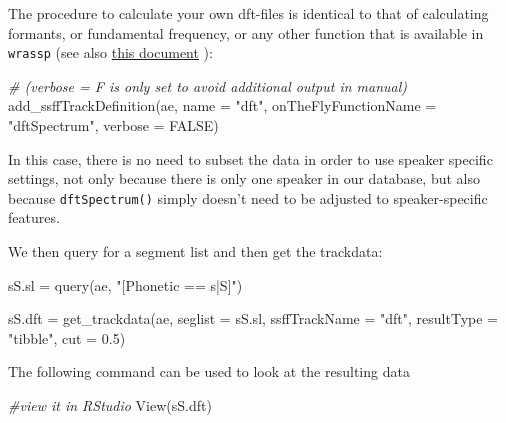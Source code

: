 \documentclass[
]{book}
\newenvironment{Shaded}{\begin{snugshade}}{\end{snugshade}}
\newcommand{\AttributeTok}[1]{\textcolor[rgb]{0.77,0.63,0.00}{#1}}
\newcommand{\CommentTok}[1]{\textcolor[rgb]{0.56,0.35,0.01}{\textit{#1}}}
\newcommand{\ConstantTok}[1]{\textcolor[rgb]{0.00,0.00,0.00}{#1}}
\newcommand{\FloatTok}[1]{\textcolor[rgb]{0.00,0.00,0.81}{#1}}
\newcommand{\FunctionTok}[1]{\textcolor[rgb]{0.00,0.00,0.00}{#1}}
\newcommand{\NormalTok}[1]{#1}
\newcommand{\OtherTok}[1]{\textcolor[rgb]{0.56,0.35,0.01}{#1}}
\newcommand{\StringTok}[1]{\textcolor[rgb]{0.31,0.60,0.02}{#1}}
\begin{document}
The procedure to calculate your own dft-files is identical to that of calculating formants, or fundamental frequency, or any other function that is available in \texttt{wrassp} (see also \href{http://www.phonetik.uni-muenchen.de/\%7Ejmh/lehre/sem/ws1819/emuR/LESSON4/Signal_Data_Calculation_Extraction_Plotting.html}{this document} ):

\begin{Shaded}
\begin{Highlighting}[]
\CommentTok{\# (verbose = F is only set to avoid additional output in manual)}
\FunctionTok{add\_ssffTrackDefinition}\NormalTok{(ae,}
                        \AttributeTok{name =} \StringTok{"dft"}\NormalTok{,}
                        \AttributeTok{onTheFlyFunctionName =} \StringTok{"dftSpectrum"}\NormalTok{,}
                        \AttributeTok{verbose =} \ConstantTok{FALSE}\NormalTok{)}
\end{Highlighting}
\end{Shaded}

In this case, there is no need to subset the data in order to use speaker specific settings, not only because there is only one speaker in our database, but also because \texttt{dftSpectrum()} simply doesn't need to be adjusted to speaker-specific features.

We then query for a segment list and then get the trackdata:

\begin{Shaded}
\begin{Highlighting}[]
\NormalTok{sS.sl }\OtherTok{=} \FunctionTok{query}\NormalTok{(ae, }
              \StringTok{"[Phonetic == s|S]"}\NormalTok{)}

\NormalTok{sS.dft }\OtherTok{=} \FunctionTok{get\_trackdata}\NormalTok{(ae, }
                       \AttributeTok{seglist =}\NormalTok{ sS.sl, }
                       \AttributeTok{ssffTrackName =} \StringTok{"dft"}\NormalTok{, }
                       \AttributeTok{resultType =} \StringTok{"tibble"}\NormalTok{,}
                       \AttributeTok{cut =} \FloatTok{0.5}\NormalTok{) }
\end{Highlighting}
\end{Shaded}

The following command can be used to look at the resulting data

\begin{Shaded}
\begin{Highlighting}[]
\CommentTok{\#view it in RStudio}
\FunctionTok{View}\NormalTok{(sS.dft)}
\end{Highlighting}
\end{Shaded}
\end{document}
